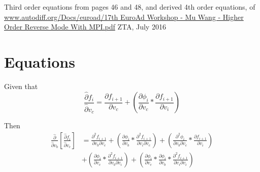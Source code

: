 \documentclass[12pt,letter]{article}
\begin{document}
	\thispagestyle{empty}
	\begin{center}
	Third order equations from pages 46 and 48, and derived 4th order equations, of
	\url{www.autodiff.org/Docs/euroad/17th EuroAd Workshop - Mu Wang - Higher Order Reverse Mode With MPI.pdf}
	ZTA, July 2016
	\end{center}
	\clearpage
	
	\newpage
	\section{Equations}
	Given that
	\begin{equation}
	\frac{\hat{\partial} f_i}{\hat{\partial} v_c} = 
	\frac{\partial f_{i+1}}{\partial v_c} + 
	\left(\frac{\partial \phi_i}{\partial v_c} * \frac{\partial f_{i+1}}{\partial v_i}\right)
	\end{equation}
	
	Then
	\begin{equation}
	\begin{split}
	\frac{\hat{\partial}}{\hat{\partial} v_b}\left[\frac{\hat{\partial} f_i}{\hat{\partial} v_c}\right]
	&=
	\frac{\partial^2 f_{i+1}}{\partial v_b \partial v_c} +
	\left(\frac{\partial\phi_i}{\partial v_b} * \frac{\partial^2 f_{i+1}}{\partial v_i \partial v_c}\right) + 
	\left(\frac{\partial^2 \phi_i}{\partial v_b \partial v_c} * \frac{\partial f_{i+1}}{\partial v_i} \right)
	\\
	&+
	\left(\frac{\partial\phi_i}{\partial v_c} * \frac{\partial^2 f_{i+1}}{\partial v_b \partial v_i}\right) +
	\left(\frac{\partial\phi_i}{\partial v_c} * \frac{\partial\phi_i}{\partial v_b} * \frac{\partial^2 f_{i+1}}{\partial v_i \partial v_i}\right)
	\end{split}
	\end{equation}
	
\end{document}
